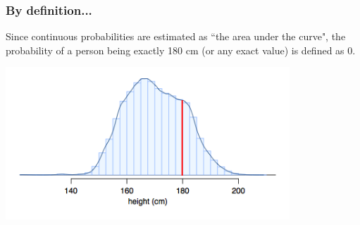 
\begin{frame}
\frametitle{By definition...}

Since continuous probabilities are estimated as ``the area under the curve", the probability of a person being exactly 180 cm (or any exact value) is defined as 0.

\begin{center}
\includegraphics[width=0.8\textwidth]{3-5_continuous_distributions/figures/fdicHeightContDist180}
\end{center}

\end{frame}

